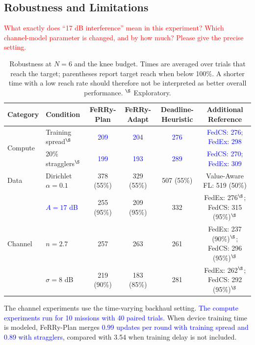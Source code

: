 \documentclass[conference]{IEEEtran}
\newcommand{\sysname}{FeRRy}
\begin{document}
\subsection{Robustness and Limitations}
\label{sec:robustness}

\textcolor{red}{What exactly does ``17 dB interference'' mean in this experiment? Which channel-model parameter is changed, and by how much? Please give the precise setting.}

\begin{table}[t]
\centering
\caption{Robustness at \(N=6\) and the knee budget. Times are averaged over
trials that reach the target; parentheses report target reach when below 100\%.
A shorter time with a low reach rate should therefore not be interpreted as
better overall performance. \(^{\S}\) Exploratory.}
\label{tab:robustness}
\small
\setlength{\tabcolsep}{5pt}

\begin{tabular}{llcccc}
\hline
\textbf{Category} &
\textbf{Condition} &
\textbf{\sysname{}-Plan} &
\textbf{\sysname{}-Adapt} &
\textbf{Deadline-Heuristic} &
\textbf{Additional Reference} \\
\hline

\multirow{2}{*}{Compute}
& Training spread\textcolor{blue}{$^{\S}$}
& \textcolor{blue}{209}
& \textcolor{blue}{204}
& \textcolor{blue}{276}
& \textcolor{blue}{FedCS: 276; FedEx: 298} \\

& 20\% stragglers\textcolor{blue}{$^{\S}$}
& \textcolor{blue}{199}
& \textcolor{blue}{193}
& \textcolor{blue}{289}
& \textcolor{blue}{FedCS: 270; FedEx: 309} \\
\hline

Data
& Dirichlet \(\alpha=0.1\)
& 378 (55\%)
& 329 (55\%)
& 507 (55\%)
& Value-Aware FL: 519 (50\%) \\
\hline

\multirow{3}{*}{Channel}
& \textcolor{blue}{\(A=17\) dB}
& 255 (95\%)
& 209 (95\%)
& 332
& FedEx: 276$^{\S}$; FedCS: 315 (95\%)$^{\S}$ \\

& \(n=2.7\)
& 257
& 263
& 261
& FedEx: 237 (90\%)$^{\S}$; FedCS: 296 (95\%)$^{\S}$ \\

& \(\sigma=8\) dB
& 219 (90\%)
& 183 (85\%)
& 281
& FedEx: 262$^{\S}$; FedCS: 292 (95\%)$^{\S}$ \\
\hline
\end{tabular}

\vspace{2pt}
\footnotesize
The channel experiments use the time-varying backhaul setting.
\textcolor{blue}{The compute experiments run for 10 missions with 40 paired trials.}
When device training time is modeled, \sysname{}-Plan merges \textcolor{blue}{0.99 updates
per round with training spread and 0.89 with stragglers}, compared with 3.54 when
training delay is not included.
\end{table}
\end{document}
